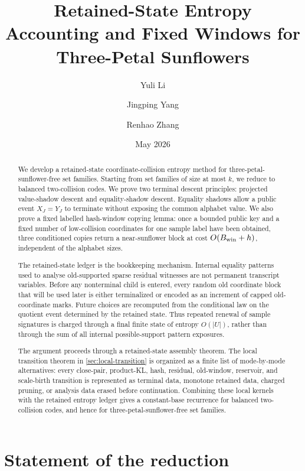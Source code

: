 \documentclass[11pt]{article}
\title{Retained-State Entropy Accounting and Fixed Windows for Three-Petal Sunflowers}
\author{Yuli Li \and Jingping Yang \and Renhao Zhang}
\date{May 2026}
\newcommand{\Cref}[1]{\ref{#1}}
\theoremstyle{remark}
\begin{document}
\maketitle

\begin{abstract}
We develop a retained-state coordinate-collision entropy method for three-petal-sunflower-free set families.  Starting from set families of size at most $k$, we reduce to balanced two-collision codes.  We prove two terminal descent principles: projected value-shadow descent and equality-shadow descent.  Equality shadows allow a public event $X_J=Y_J$ to terminate without exposing the common alphabet value.  We also prove a fixed labelled hash-window copying lemma: once a bounded public key and a fixed number of low-collision coordinates for one sample label have been obtained, three conditioned copies return a near-sunflower block at cost $O(B_{\rm win}+h)$, independent of the alphabet sizes.

The retained-state ledger is the bookkeeping mechanism.  Internal equality patterns used to analyse old-supported sparse residual witnesses are not permanent transcript variables.  Before any nonterminal child is entered, every random old coordinate block that will be used later is either terminalized or encoded as an increment of capped old-coordinate marks.  Future choices are recomputed from the conditional law on the quotient event determined by the retained state.  Thus repeated renewal of sample signatures is charged through a final finite state of entropy $O(|U|)$, rather than through the sum of all internal possible-support pattern exposures.

The argument proceeds through a retained-state assembly theorem.  The local transition theorem in \Cref{sec:local-transition} is organized as a finite list of mode-by-mode alternatives: every close-pair, product-KL, hash, residual, old-window, reservoir, and scale-birth transition is represented as terminal data, monotone retained data, charged pruning, or analysis data erased before continuation.  Combining these local kernels with the retained entropy ledger gives a constant-base recurrence for balanced two-collision codes, and hence for three-petal-sunflower-free set families.
\end{abstract}

\section{Statement of the reduction}
\end{document}
